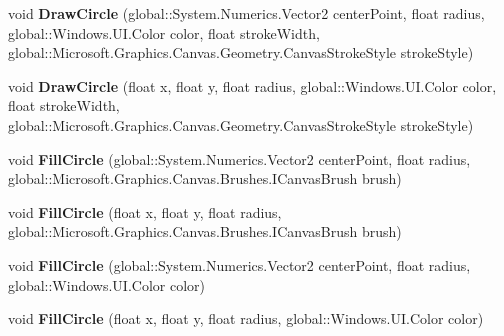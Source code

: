 \begin{DoxyCompactItemize}
void {\bfseries Draw\+Circle} (global\+::\+System.\+Numerics.\+Vector2 center\+Point, float radius, global\+::\+Windows.\+U\+I.\+Color color, float stroke\+Width, global\+::\+Microsoft.\+Graphics.\+Canvas.\+Geometry.\+Canvas\+Stroke\+Style stroke\+Style)
\item 
\mbox{\label{class_microsoft_1_1_graphics_1_1_canvas_1_1_canvas_drawing_session_a60b1f54cf2c911a8bd2f75bad37eb567}} 
void {\bfseries Draw\+Circle} (float x, float y, float radius, global\+::\+Windows.\+U\+I.\+Color color, float stroke\+Width, global\+::\+Microsoft.\+Graphics.\+Canvas.\+Geometry.\+Canvas\+Stroke\+Style stroke\+Style)
\item 
\mbox{\label{class_microsoft_1_1_graphics_1_1_canvas_1_1_canvas_drawing_session_a8c2a207a7a66049f42625d17605c921d}} 
void {\bfseries Fill\+Circle} (global\+::\+System.\+Numerics.\+Vector2 center\+Point, float radius, global\+::\+Microsoft.\+Graphics.\+Canvas.\+Brushes.\+I\+Canvas\+Brush brush)
\item 
\mbox{\label{class_microsoft_1_1_graphics_1_1_canvas_1_1_canvas_drawing_session_ab32da62378a622647806e11cb61222f9}} 
void {\bfseries Fill\+Circle} (float x, float y, float radius, global\+::\+Microsoft.\+Graphics.\+Canvas.\+Brushes.\+I\+Canvas\+Brush brush)
\item 
\mbox{\label{class_microsoft_1_1_graphics_1_1_canvas_1_1_canvas_drawing_session_a4ba02fb1533d2fc66a256224d977ef80}} 
void {\bfseries Fill\+Circle} (global\+::\+System.\+Numerics.\+Vector2 center\+Point, float radius, global\+::\+Windows.\+U\+I.\+Color color)
\item 
\mbox{\label{class_microsoft_1_1_graphics_1_1_canvas_1_1_canvas_drawing_session_a591dd64dd2156135701928d1169760e7}} 
void {\bfseries Fill\+Circle} (float x, float y, float radius, global\+::\+Windows.\+U\+I.\+Color color)
\item 
\mbox{\label{class_microsoft_1_1_graphics_1_1_canvas_1_1_canvas_drawing_session_ab13254390f363d3c656f73182f5ac63a}} 

\end{DoxyCompactItemize}
